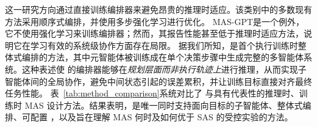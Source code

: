这一研究方向通过直接训练编排器来避免昂贵的推理时适应。该类别中的多数现有方法采用顺序式编排，并使用多步强化学习进行优化\citep{su2025toolorchestraelevatingintelligenceefficient,nie2025weakforstrong}。
MAS-GPT\citep{ye2025masgpttrainingllmsbuild}是一个例外，它不使用强化学习来训练编排器；然而，其报告性能甚至低于推理时适应方法\citep{Ke2025MASZero}，说明它在学习有效的系统级协作方面存在局限。
据我们所知，\ourframework 是首个执行训练时整体式编排的方法，其中元智能体被训练成在单个决策步骤中生成完整的多智能体系统。这种表述使 \ourframework 的编排器能够在\emph{规划层面而非执行轨迹上}进行推理，从而实现子智能体间的全局协作，避免中间状态引起的误差累积，并让训练目标直接对齐最终任务性能。
表~\ref{tab:method_comparison}系统对比了 \ourframework 与具有代表性的推理时、训练时 MAS 设计方法。结果表明，\ourframework 是唯一同时支持面向目标的子智能体、整体式编排、可配置 \masness，以及旨在理解 MAS 何时及如何优于 SAS 的受控实验的方法。



